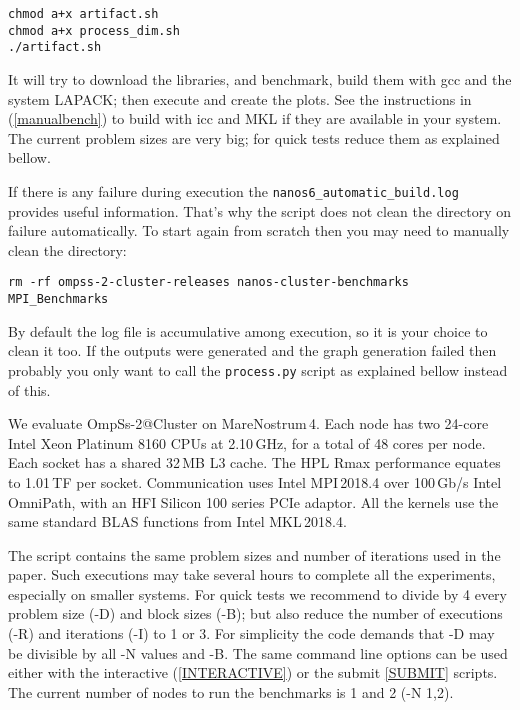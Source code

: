 \documentclass{article}
\newcommand{\code}[1]{\texttt{#1}}
\begin{document}
\begin{lstlisting}
chmod a+x artifact.sh
chmod a+x process_dim.sh
./artifact.sh
\end{lstlisting}

It will try to download the libraries, and benchmark, build them with
gcc and the system LAPACK; then execute and create the plots. See the
instructions in (\ref{manualbench}) to build with icc and MKL if they
are available in your system. The current problem sizes are very big;
for quick tests reduce them as explained bellow.

If there is any failure during execution the
\code{nanos6\_automatic\_build.log} provides useful
information. That's why the script does not clean the directory on
failure automatically.  To start again from scratch then you may need
to manually clean the directory:

\begin{lstlisting}
rm -rf ompss-2-cluster-releases nanos-cluster-benchmarks MPI_Benchmarks
\end{lstlisting}

By default the log file is accumulative among execution, so it is your
choice to clean it too.  If the outputs were generated and the graph
generation failed then probably you only want to call the
\code{process.py} script as explained bellow instead of this.

We evaluate OmpSs-2@Cluster on MareNostrum\,4. Each node has two
24-core Intel Xeon Platinum 8160 CPUs at 2.10\,GHz, for a total of 48
cores per node.  Each socket has a shared 32\,MB L3 cache.  The HPL
Rmax performance equates to 1.01\,TF per socket.  Communication uses
Intel MPI\,2018.4 over 100\,Gb/s Intel OmniPath, with an HFI Silicon
100 series PCIe adaptor.  All the kernels use the same standard BLAS
functions from Intel MKL\,2018.4.

The script contains the same problem sizes and number of iterations
used in the paper. Such executions may take several hours to complete
all the experiments, especially on smaller systems. For quick tests we
recommend to divide by 4 every problem size (-D) and block sizes (-B);
but also reduce the number of executions (-R) and iterations (-I) to 1
or 3. For simplicity the code demands that -D may be divisible by all
-N values and -B. The same command line options can be used either
with the interactive (\ref{INTERACTIVE}) or the submit \ref{SUBMIT}
scripts. The current number of nodes to run the benchmarks is 1 and 2
(-N 1,2).
\end{document}
